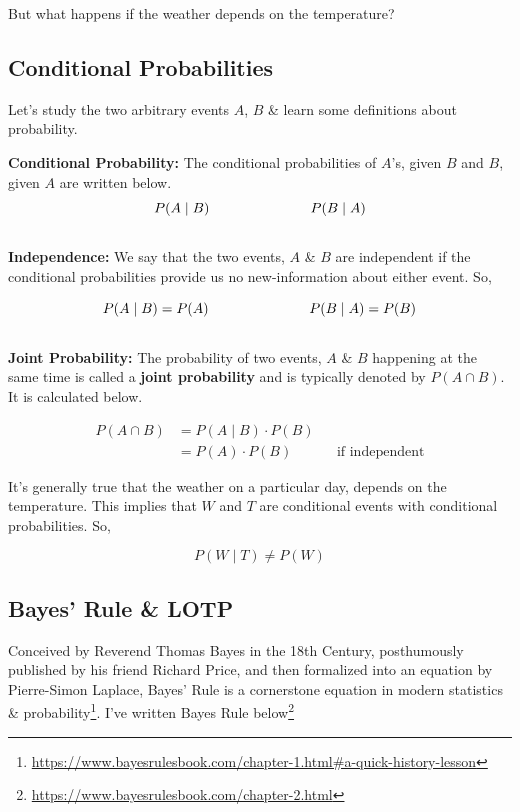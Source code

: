 \documentclass[
]{book}
\begin{document}
But what happens if the weather depends on the temperature?

\hfill\break
\hfill\break

\hypertarget{conditional-probabilities}{%
\subsection*{Conditional Probabilities}\label{conditional-probabilities}}

Let's study the two arbitrary events \(A\), \(B\) \& learn some definitions about probability.

\textbf{Conditional Probability:}
The conditional probabilities of \(A\)'s, given \(B\) and \(B\), given \(A\) are written below.
\[P(A \mid B) \hspace{1 in}P(B \mid A)\]\\

\textbf{Independence:}
We say that the two events, \(A\) \& \(B\) are independent if the conditional probabilities provide us no new-information about either event. So,

\[P(A \mid B) = P(A) \hspace{1 in}P(B \mid A) = P(B)\]\\

\textbf{Joint Probability:}
The probability of two events, \(A\) \& \(B\) happening at the same time is called a \textbf{joint probability} and is typically denoted by \(P(A\cap B)\). It is calculated below.

\begin{align*} 
P(A\cap B) &= P(A \mid B) \cdot P(B)\\
&= P(A) \cdot P(B) && \text{if independent}
\end{align*}

\hfill\break
\hfill\break

It's generally true that the weather on a particular day, depends on the temperature. This implies that \(W\) and \(T\) are conditional events with conditional probabilities. So,

\[P(W\mid T) \neq P(W)\]

\hypertarget{bayes-rule-lotp}{%
\subsection*{Bayes' Rule \& LOTP}\label{bayes-rule-lotp}}

Conceived by Reverend Thomas Bayes in the 18th Century, posthumously published by his friend Richard Price, and then formalized into an equation by Pierre-Simon Laplace, Bayes' Rule is a cornerstone equation in modern statistics \& probability\footnote{\url{https://www.bayesrulesbook.com/chapter-1.html\#a-quick-history-lesson}}. I've written Bayes Rule below\footnote{\url{https://www.bayesrulesbook.com/chapter-2.html}}
\end{document}
